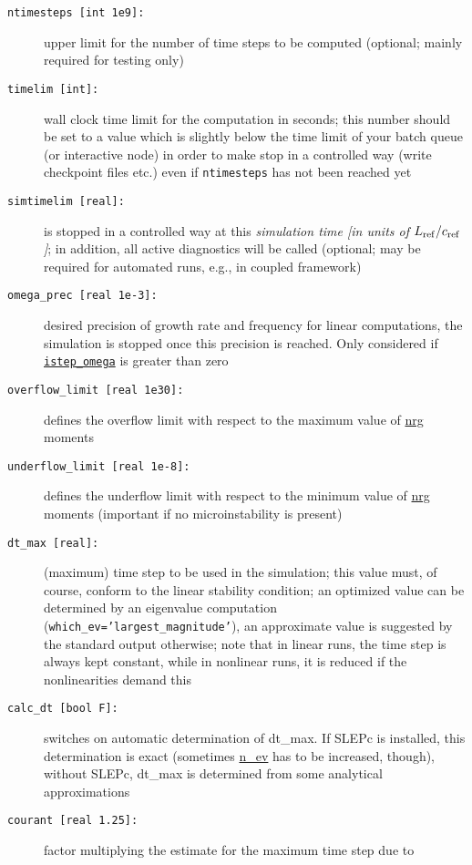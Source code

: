 \documentclass[12pt]{article}
\begin{document}
\begin{description}
\item[\texttt{ntimesteps [int 1e9]:}] upper limit for the number of time steps to be computed (optional; mainly required for testing only)
\item[\hypertarget{timelim}{\texttt{timelim [int]:}}] wall clock time limit for the \gene computation in seconds; this number
  should be set to a value which is slightly below the time limit of your batch queue (or interactive
  node) in order to make \gene stop in a  controlled way (write checkpoint files etc.) even if
  \texttt{ntimesteps} has not been reached yet
\item[\texttt{simtimelim [real]:}] \gene is stopped in a controlled way at this {\em simulation time [in units of
 $L_{\rm ref}/c_{\rm ref}$]}; in addition, all active diagnostics will be called (optional; may be required for automated \gene runs, e.g., in coupled framework)
\item[\hypertarget{omega_prec}{\tt omega\_prec [real 1e-3]:}]
  desired precision of growth rate and frequency for linear computations, the simulation is stopped once
  this precision is reached. Only considered if \hyperlink{istep_omega}{\tt istep\_omega} is greater than zero
\item[{\tt overflow\_limit [real 1e30]:}] defines the overflow limit with respect to the maximum
  value of \hyperref[subsec:nrg-file]{nrg} moments
\item[{\tt underflow\_limit [real 1e-8]:}] defines the underflow limit with respect to the minimum
  value of \hyperref[subsec:nrg-file]{nrg} moments (important if no microinstability is present)
\item[\texttt{dt\_max [real]:}] (maximum) time step to be used in the simulation; this value must,
  of course, conform to the linear stability condition; an optimized value can be determined by an
  eigenvalue computation \\(\texttt{which\_ev='largest\_magnitude'}), an approximate value is suggested by the \gene
  standard output otherwise; note that in linear runs, the time step is always kept constant,
  while in nonlinear runs, it is reduced if the nonlinearities demand this
\item[\texttt{calc\_dt [bool F]:}] switches on automatic determination of dt\_max. If SLEPc is installed,
  this determination is exact (sometimes \hyperlink{n_ev}{n\_ev} has to be increased,
  though), without SLEPc, dt\_max is determined from some analytical approximations
\item[\texttt{courant [real 1.25]:}] factor multiplying the estimate for the maximum time step due to

\end{description}
\end{document}
